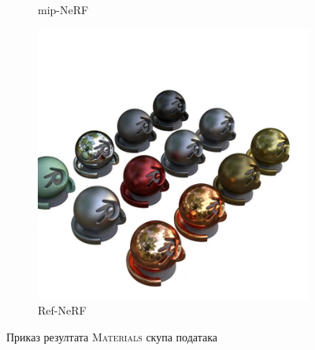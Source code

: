 \documentclass[12pt, a4paper, twoside]{book}
\numberwithin{equation}{chapter}
\numberwithin{theorem}{section}
\numberwithin{definition}{section}
\numberwithin{definitionChapter}{chapter}
\begin{document}
\begin{figure}[H]
\begin{subfigure}{0.3\textwidth}
			\caption{mip-NeRF}
		\end{subfigure}
		\hspace*{\fill}
		\begin{subfigure}{0.3\textwidth}
			\centering
			\includegraphics[scale=0.2]{img/refnerf/refnerf_materials_36.jpg}
			\caption{Ref-NeRF}
		\end{subfigure}
		\caption{Приказ резултата \textsc{Materials} скупа података}
		\label{fig-materials-results}
	\end{figure}
\end{document}
